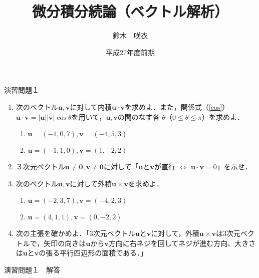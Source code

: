 \documentclass{jarticle}
\begin{document}
\title{微分積分続論（ベクトル解析）} 
\author{鈴木　咲衣}
\date{平成27年度前期}
\maketitle

\begin{center} {\Large 演習問題１ } \end{center}

\begin{enumerate}
\item 次のベクトル$\bm u, \bm v$に対して内積$\bm u \cdot \bm v$を求めよ．また，関係式（\ref{cos}）$\bm u \cdot \bm v=|\bm u| |\bm v|\cos \theta $を用いて，$\bm u, \bm v$の間のなす各 $\theta$（$0\leq \theta \leq \pi$）を求めよ．
\begin{enumerate}
\item $\bm u= (-1, 0, 7), \bm v= (-4, 5,3)$ \label{a}
\item $\bm u= (-1, 1, 0), \bm v= (1, -2, 2)$ \label{b}
\end{enumerate}

\item ３次元ベクトル$\bm u\not =\bm 0, \bm v\not= \bm 0$に対して「$\bm u$と$\bm v$が直行 $\iff$ $\bm u \cdot \bm v=0$」を示せ．
\item 次のベクトル$\bm u, \bm v$に対して外積$\bm u \times \bm v$を求めよ．
\begin{enumerate}
\item $\bm u= (-2, 3, 7), \bm v= (-4, 2,3)$
\item $\bm u= (4, 1, 1), \bm v= (0, -2, 2)$
\end{enumerate}

\item 次の主張を確かめよ．「$3$次元ベクトル$\bm u$と$\bm v$に対して，外積$\bm u \times \bm v$は$3$次元ベクトルで，矢印の向きは$\bm u$から$\bm v$方向に右ネジを回してネジが進む方向、大きさは$\bm u$と$\bm v$の張る平行四辺形の面積である．」
\end{enumerate}

\newpage

\begin{center} {\Large 演習問題１　解答} \end{center}
\end{document}

